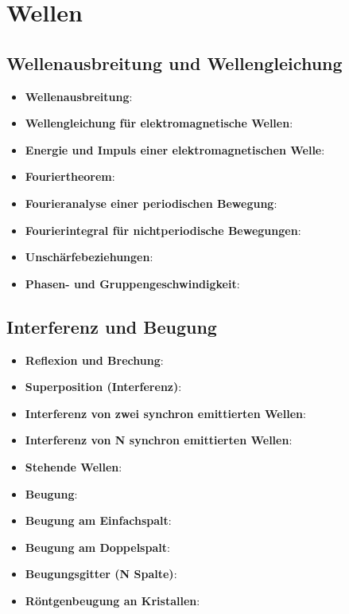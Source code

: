 \section{Wellen}%
\label{wellen:sec:wellen}

\subsection{Wellenausbreitung und Wellengleichung}%
\label{wellen:sub:wellenausbreitung_und_wellengleichung}

\begin{itemize}
	\item \textbf{Wellenausbreitung}:
	\item \textbf{Wellengleichung für elektromagnetische Wellen}:
	\item \textbf{Energie und Impuls einer elektromagnetischen Welle}:
	\item \textbf{Fouriertheorem}:
	\item \textbf{Fourieranalyse einer periodischen Bewegung}:
	\item \textbf{Fourierintegral für nichtperiodische Bewegungen}:
	\item \textbf{Unschärfebeziehungen}:
	\item \textbf{Phasen- und Gruppengeschwindigkeit}:
\end{itemize}

\subsection{Interferenz und Beugung}%
\label{wellen:sub:interferenz_und_beugung}

\begin{itemize}
	\item \textbf{Reflexion und Brechung}:
	\item \textbf{Superposition (Interferenz)}:
	\item \textbf{Interferenz von zwei synchron emittierten Wellen}:
	\item \textbf{Interferenz von N synchron emittierten Wellen}:
	\item \textbf{Stehende Wellen}:
	\item \textbf{Beugung}:
	\item \textbf{Beugung am Einfachspalt}:
	\item \textbf{Beugung am Doppelspalt}:
	\item \textbf{Beugungsgitter (N Spalte)}:
	\item \textbf{Röntgenbeugung an Kristallen}:
\end{itemize}